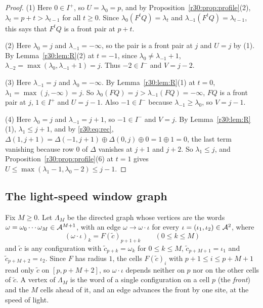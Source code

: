 \begin{proof}
(1) Here $0\in I^+$, so $U=\lambda_0=p$, and by Proposition~\ref{r30:prop:profile}(2), $\lambda_t=p+t>\lambda_{t-1}$ for all $t\ge0$. Since $\lambda_0(F^tQ)=\lambda_t$ and $\lambda_{-1}(F^tQ)=\lambda_{t-1}$, this says that $F^tQ$ is a front pair at $p+t$.

(2) Here $\lambda_0=j$ and $\lambda_{-1}=-\infty$, so the pair is a front pair at $j$ and $U=j$ by (1). By Lemma~\ref{r30:lem:R}(2) at $t=-1$, since $\lambda_0\ne\lambda_{-1}+1$, $\lambda_{-2}=\max(\lambda_0,\lambda_{-1}+1)=j$. Thus $-2\in I^-$ and $V=j-2$.

(3) Here $\lambda_{-1}=j$ and $\lambda_0=-\infty$. By Lemma~\ref{r30:lem:R}(1) at $t=0$, $\lambda_1=\max(j,-\infty)=j$. So $\lambda_0(FQ)=j>\lambda_{-1}(FQ)=-\infty$, $FQ$ is a front pair at $j$, $1\in I^+$ and $U=j-1$. Also $-1\in I^-$ because $\lambda_{-1}\ge\lambda_0$, so $V=j-1$.

(4) Here $\lambda_0=j$ and $\lambda_{-1}=j+1$, so $-1\in I^-$ and $V=j$. By Lemma~\ref{r30:lem:R}(1), $\lambda_1\le j+1$, and by \eqref{r30:eq:rec}, $\Delta(1,j+1)=\Delta(-1,j+1)\oplus\Delta(0,j)\oplus0=1\oplus1=0$, the last term vanishing because row $0$ of $\Delta$ vanishes at $j+1$ and $j+2$. So $\lambda_1\le j$, and Proposition~\ref{r30:prop:profile}(6) at $t=1$ gives $U\le\max(\lambda_1-1,\lambda_0-2)\le j-1$.
\end{proof}

\subsection{The light-speed window graph}\label{r30:sec:window}

Fix $M\ge0$. Let $\Lambda_M$ be the directed graph whose vertices are the words $\omega=\omega_0\cdots\omega_M\in\mathcal{A}^{M+1}$, with an edge $\omega\to\omega\cdot\iota$ for every $\iota=(\iota_1,\iota_2)\in\mathcal{A}^2$, where
\[
(\omega\cdot\iota)_k=F(\tilde c)_{p+1+k}\qquad(0\le k\le M)
\]
and $\tilde c$ is any configuration with $\tilde c_{p+k}=\omega_k$ for $0\le k\le M$, $\tilde c_{p+M+1}=\iota_1$ and $\tilde c_{p+M+2}=\iota_2$. Since $F$ has radius $1$, the cells $F(\tilde c)_i$ with $p+1\le i\le p+M+1$ read only $\tilde c$ on $[p,p+M+2]$, so $\omega\cdot\iota$ depends neither on $p$ nor on the other cells of $\tilde c$. A vertex of $\Lambda_M$ is the word of a single configuration on a cell $p$ (the \emph{front}) and the $M$ cells ahead of it, and an edge advances the front by one site, at the speed of light.

